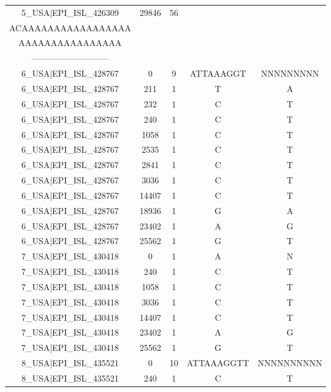 \documentclass[a4paper,10pt]{article}
\begin{document}
\begin{longtable}{@{}ccccc@{}}
5\_USA|EPI\_ISL\_426309 & 29846 & 56 & \begin{tabular}[c]{@{}c@{}}TAATAGCTTCTTAGGAGAATG\\ ACAAAAAAAAAAAAAAAAA\\ AAAAAAAAAAAAAAAA\end{tabular} & \begin{tabular}[c]{@{}c@{}}-----------------------------\\ ---------------------------\end{tabular} \\* \midrule
6\_USA|EPI\_ISL\_428767 & 0 & 9 & ATTAAAGGT & NNNNNNNNN \\* \midrule
6\_USA|EPI\_ISL\_428767 & 211 & 1 & T & A \\* \midrule
6\_USA|EPI\_ISL\_428767 & 232 & 1 & C & T \\* \midrule
6\_USA|EPI\_ISL\_428767 & 240 & 1 & C & T \\* \midrule
6\_USA|EPI\_ISL\_428767 & 1058 & 1 & C & T \\* \midrule
6\_USA|EPI\_ISL\_428767 & 2535 & 1 & C & T \\* \midrule
6\_USA|EPI\_ISL\_428767 & 2841 & 1 & C & T \\* \midrule
6\_USA|EPI\_ISL\_428767 & 3036 & 1 & C & T \\* \midrule
6\_USA|EPI\_ISL\_428767 & 14407 & 1 & C & T \\* \midrule
6\_USA|EPI\_ISL\_428767 & 18936 & 1 & G & A \\* \midrule
6\_USA|EPI\_ISL\_428767 & 23402 & 1 & A & G \\* \midrule
6\_USA|EPI\_ISL\_428767 & 25562 & 1 & G & T \\* \midrule
7\_USA|EPI\_ISL\_430418 & 0 & 1 & A & N \\* \midrule
7\_USA|EPI\_ISL\_430418 & 240 & 1 & C & T \\* \midrule
7\_USA|EPI\_ISL\_430418 & 1058 & 1 & C & T \\* \midrule
7\_USA|EPI\_ISL\_430418 & 3036 & 1 & C & T \\* \midrule
7\_USA|EPI\_ISL\_430418 & 14407 & 1 & C & T \\* \midrule
7\_USA|EPI\_ISL\_430418 & 23402 & 1 & A & G \\* \midrule
7\_USA|EPI\_ISL\_430418 & 25562 & 1 & G & T \\* \midrule
8\_USA|EPI\_ISL\_435521 & 0 & 10 & ATTAAAGGTT & NNNNNNNNNN \\* \midrule
8\_USA|EPI\_ISL\_435521 & 240 & 1 & C & T \\* \midrule

\end{longtable}
\end{document}
